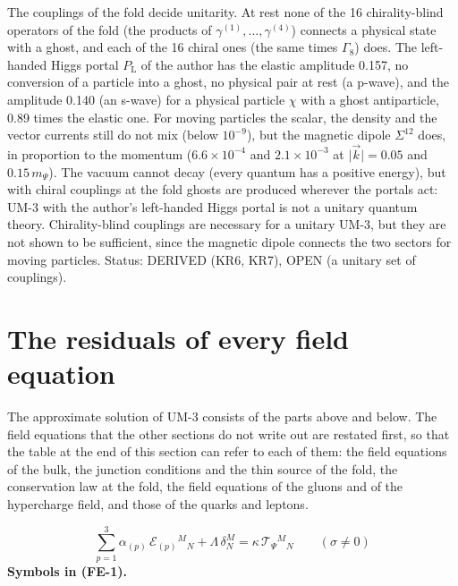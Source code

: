 \documentclass[
  10pt,
]{article}
\begin{document}
The couplings of the fold decide unitarity. At rest none of the 16
chirality-blind operators of the fold (the products of
\(\gamma^{(1)}, \dots, \gamma^{(4)}\)) connects a physical state with a
ghost, and each of the 16 chiral ones (the same times \(\Gamma_8\))
does. The left-handed Higgs portal \(P_{\mathrm{L}}\) of the author has
the elastic amplitude 0.157, no conversion of a particle into a ghost,
no physical pair at rest (a p-wave), and the amplitude 0.140 (an s-wave)
for a physical particle \(\chi\) with a ghost antiparticle, 0.89 times
the elastic one. For moving particles the scalar, the density and the
vector currents still do not mix (below \(10^{-9}\)), but the magnetic
dipole \(\Sigma^{12}\) does, in proportion to the momentum
(\(6.6\times10^{-4}\) and \(2.1\times10^{-3}\) at
\(\lvert\vec k\rvert = 0.05\) and \(0.15\,m_\Psi\)). The vacuum cannot
decay (every quantum has a positive energy), but with chiral couplings
at the fold ghosts are produced wherever the portals act: UM-3 with the
author's left-handed Higgs portal is not a unitary quantum theory.
Chirality-blind couplings are necessary for a unitary UM-3, but they are
not shown to be sufficient, since the magnetic dipole connects the two
sectors for moving particles. Status: DERIVED (KR6, KR7), OPEN (a
unitary set of couplings).

\hypertarget{the-residuals-of-every-field-equation}{%
\section{The residuals of every field
equation}\label{the-residuals-of-every-field-equation}}

The approximate solution of UM-3 consists of the parts above and below.
The field equations that the other sections do not write out are
restated first, so that the table at the end of this section can refer
to each of them: the field equations of the bulk, the junction
conditions and the thin source of the fold, the conservation law at the
fold, the field equations of the gluons and of the hypercharge field,
and those of the quarks and leptons.

\[
\sum_{p=1}^{3}\alpha_{(p)}\,\mathcal{E}_{(p)}{}^M{}_N + \Lambda\,\delta^M_N
 = \kappa\,\mathcal{T}_\Psi{}^M{}_N\qquad (\sigma \ne 0) \tag{FE-1}
\] \textbf{Symbols in (FE-1).}
\end{document}
